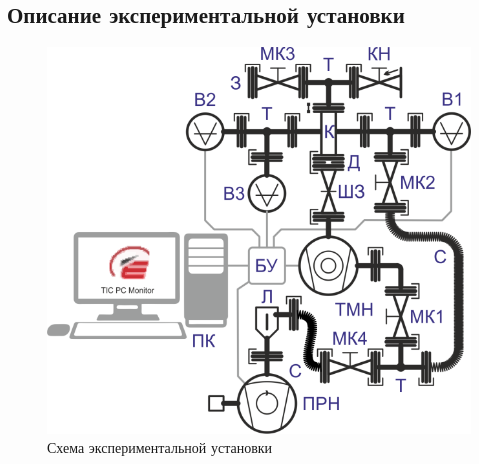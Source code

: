 \documentclass[a4paper,12pt]{article}
\begin{document}
\subsection{Описание экспериментальной установки}

\begin{figure}[h]
	\centering
	\includegraphics[width=0.5\linewidth]{fig.png}
	\caption{Схема экспериментальной установки}
	\label{setup1}
\end{figure}
\end{document}
